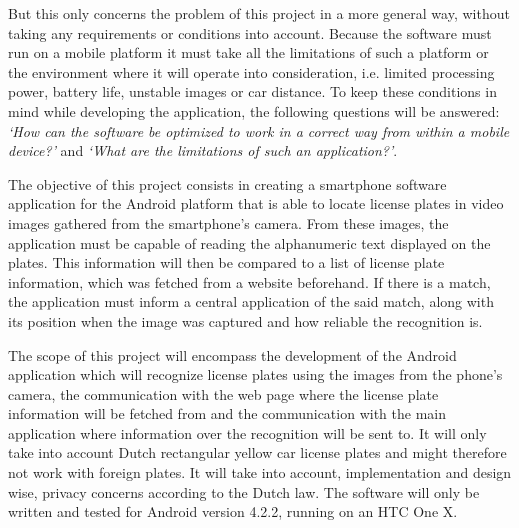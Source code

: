 But this only concerns the problem of this project in a more general way, without taking any requirements or conditions into account. Because the software must run on a mobile platform it must take all the limitations of such a platform or the environment where it will operate into consideration, i.e. limited processing power, battery life, unstable images or car distance. To keep these conditions in mind while developing the application, the following questions will be answered: \textit{`How can the software be optimized to work in a correct way from within a mobile device?'} and \textit{`What are the limitations of such an application?'}.


The objective of this project consists in creating a smartphone software application for the Android platform that is able to locate license plates in video images gathered from the smartphone's camera. From these images, the application must be capable of reading the alphanumeric text displayed on the plates. This information will then be compared to a list of license plate information, which was fetched from a website beforehand. If there is a match, the application must inform a central application of the said match, along with its position when the image was captured and how reliable the recognition is.


The scope of this project will encompass the development of the Android application which will recognize license plates using the images from the phone's camera, the communication with the web page where the license plate information will be fetched from and the communication with the main application where information over the recognition will be sent to. It will only take into account Dutch rectangular yellow car license plates and might therefore not work with foreign plates. It will take into account, implementation and design wise, privacy concerns according to the Dutch law. The software will only be written and tested for Android version 4.2.2, running on an HTC One X.

